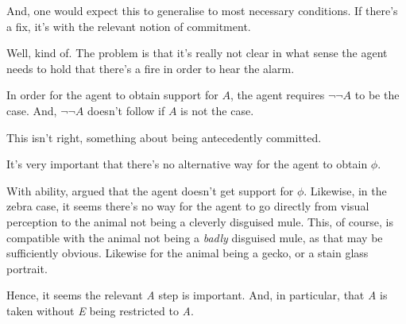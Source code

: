 \documentclass[10pt]{article}
\begin{document}
\begin{note}
  And, one would expect this to generalise to most necessary conditions.
  If there's a fix, it's with the relevant notion of commitment.

  Well, kind of.
  The problem is that it's really not clear in what sense the agent needs to hold that there's a fire in order to hear the alarm.

  In order for the agent to obtain support for \(A\), the agent requires \(\lnot\lnot A\) to be the case.
  And, \(\lnot\lnot A\) doesn't follow if \(A\) is not the case.

  This isn't right, something about being antecedently committed.
\end{note}


\begin{note}
  It's very important that there's no alternative way for the agent to obtain \(\phi\).

  With ability, argued that the agent doesn't get support for \(\phi\).
  Likewise, in the zebra case, it seems there's no way for the agent to go directly from visual perception to the animal not being a cleverly disguised mule.
  This, of course, is compatible with the animal not being a \emph{badly} disguised mule, as that may be sufficiently obvious.
  Likewise for the animal being a gecko, or a stain glass portrait.

  Hence, it seems the relevant \emph{A} step is important.
  And, in particular, that \emph{A} is taken without \emph{E} being restricted to \emph{A}.
\end{note}
\end{document}
